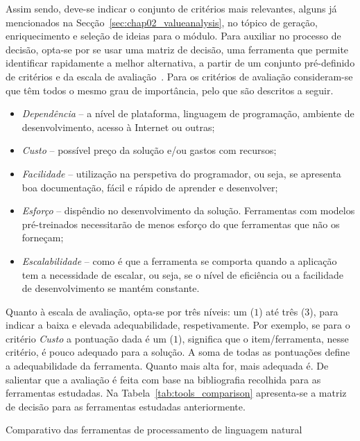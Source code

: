 Assim sendo, deve-se indicar o conjunto de critérios mais relevantes, alguns já mencionados na Secção~\ref{sec:chap02_valueanalysis}, no tópico de geração, enriquecimento e seleção de ideias para o módulo. Para auxiliar no processo de decisão, opta-se por se usar uma matriz de decisão, uma ferramenta que permite identificar rapidamente a melhor alternativa, a partir de um conjunto pré-definido de critérios e da escala de avaliação~\parencite{decisions_engineering_design}.
Para os critérios de avaliação consideram-se que têm todos o mesmo grau de importância, pelo que são descritos a seguir.

\begin{itemize}
    \item
    {
        \textit{Dependência} -- a nível de plataforma, linguagem de programação, ambiente de desenvolvimento, acesso à Internet ou outras;
    }
    \item
    {
        \textit{Custo} -- possível preço da solução e/ou gastos com recursos;  
    }
    \item
    {
        \textit{Facilidade} -- utilização na perspetiva do programador, ou seja, se apresenta boa documentação, fácil e rápido de aprender e desenvolver;
    }
    \item
    {
        \textit{Esforço} -- dispêndio no desenvolvimento da solução. Ferramentas com modelos pré-treinados necessitarão de menos esforço do que ferramentas que não os forneçam;
    }
    \item
    {
        \textit{Escalabilidade} -- como é que a ferramenta se comporta quando a aplicação tem a necessidade de escalar, ou seja, se o nível de eficiência ou a facilidade de desenvolvimento se mantém constante.
    }
\end{itemize}

Quanto à escala de avaliação, opta-se por três níveis: um ($1$) até três ($3$), para indicar a baixa e elevada adequabilidade, respetivamente. Por exemplo, se para o critério \textit{Custo} a pontuação dada é um ($1$), significa que o item/ferramenta, nesse critério, é pouco adequado para a solução. A soma de todas as pontuações define a adequabilidade da ferramenta. Quanto mais alta for, mais adequada é. De salientar que a avaliação é feita com base na bibliografia recolhida para as ferramentas estudadas. Na Tabela~\ref{tab:tools_comparison} apresenta-se a matriz de decisão para as ferramentas estudadas anteriormente.

\begin{table}[!ht]
\caption{Comparativo das ferramentas de processamento de linguagem natural}
\label{tab:tools_comparison}
\centering
\resizebox{\textwidth}{!}{}
\end{table}

